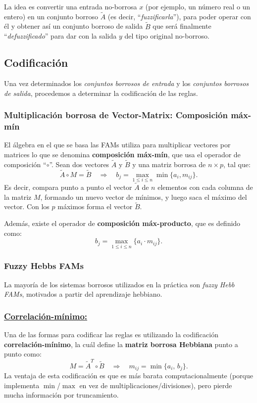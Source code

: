 \documentclass[10pt,a4paper]{article}
\begin{document}
La idea es convertir una entrada no-borrosa $x$ (por ejemplo, un número real o un entero) en un conjunto borroso $\tilde{A}$ (es decir, ``\textit{fuzzificarla}''), para poder operar con él y obtener así un conjunto borroso de salida $\tilde{B}$ que será finalmente ``\textit{defuzzificado}'' para dar con la salida $y$ del tipo original no-borroso.

\subsection{Codificación}

Una vez determinados los \textit{conjuntos borrosos de entrada} y los \textit{conjuntos borrosos de salida}, procedemos a determinar la codificación de las reglas.

\subsubsection{Multiplicación borrosa de Vector-Matrix: Composición máx-mín}

El álgebra en el que se basa las FAMs utiliza para multiplicar vectores por matrices lo que se denomina \textbf{composición máx-mín}, que usa el operador de composición ``$\circ$''. Sean dos vectores $\tilde{A}$ y $\tilde{B}$ y una matriz borrosa de $n\times p$, tal que:
\[
\tilde{A}\circ M = \tilde{B} \quad \Rightarrow \quad b_j = \max_{1\leq i \leq n} \min \{ a_i, m_{ij}\}.
\]
Es decir, compara punto a punto el vector $\tilde{A}$ de $n$ elementos con cada columna de la matriz $M$, formando un nuevo vector de mínimos, y luego saca el máximo del vector. Con los $p$ máximos forma el vector $\tilde{B}$.

Además, existe el operador de \textbf{composición máx-producto}, que es definido como:
\[
b_j = \max_{1\leq i \leq n} \{ a_i \cdot m_{ij} \}.
\]

\subsubsection{Fuzzy Hebbs FAMs}

La mayoría de los sistemas borrosos utilizados en la práctica son \textit{fuzzy Hebb FAMs}, motivados a partir del aprendizaje hebbiano.

\subsubsection*{\underline{Correlación-mínimo:}}

Una de las formas para codificar las reglas es utilizando la codificación \textbf{correlación-mínimo}, la cuál define la \textbf{matriz borrosa Hebbiana} punto a punto como:
\[
M = \tilde{A}^T \circ \tilde{B} \quad \Rightarrow \quad m_{ij} = \min\{a_i,\,b_j\}.
\]
La ventaja de esta codificación es que es más barata computacionalmente (porque implementa $\min$/$\max$ en vez de multiplicaciones/divisiones), pero pierde mucha información por truncamiento.
\end{document}
